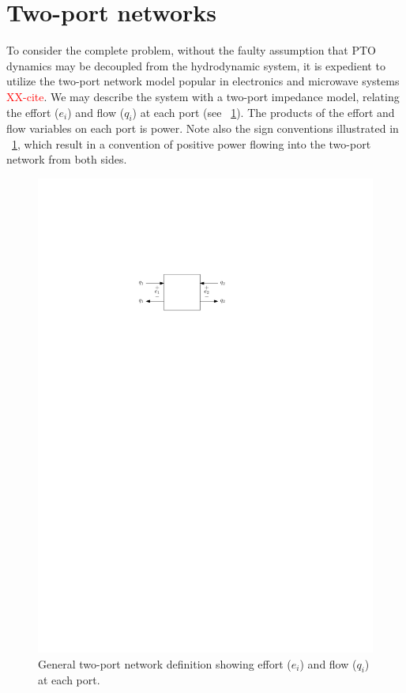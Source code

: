 \documentclass[lettersize,journal]{IEEEtran}
\newcommand{\rc}[1]{\textcolor{red}{#1}}
\begin{document}

\section{Two-port networks}\label{sec:two_port_networks}
To consider the complete problem, without the faulty assumption that PTO dynamics may be decoupled from the hydrodynamic system, it is expedient to utilize the two-port network model popular in electronics and microwave systems \rc{XX-cite}.
We may describe the system with a two-port impedance model, relating the effort ($e_i$) and flow ($q_i$) at each port (see \figurename~\ref{fig:wec_as_multiport_general_two_port_network}).
The products of the effort and flow variables on each port is power.
Note also the sign conventions illustrated in \figurename~\ref{fig:wec_as_multiport_general_two_port_network}, which result in a convention of positive power flowing into the two-port network from both sides.

\begin{figure}[tb]
        \centering
        \includegraphics[width=0.75\columnwidth]{wec_as_multiport_general_two_port_network.pdf}
        \caption{General two-port network definition showing effort ($e_i$) and flow ($q_i$) at each port.}
        \label{fig:wec_as_multiport_general_two_port_network}
\end{figure}
\end{document}
